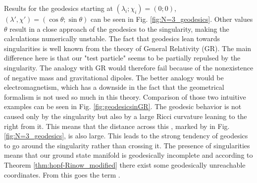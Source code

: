 Results for the geodesics starting at $(\lambda_i;\chi_i)=(0;0)$, $
(\lambda',\chi')=(\cos\theta;\sin\theta)$ can be seen in Fig. \ref{fig:N=3_geodesics}. Other values $\theta$ result in a close approach of the geodesics to the singularity, making the calculations numerically unstable. The fact that geodesics lean towards singularities is well known from the theory of General Relativity (GR). The main difference here is that our "test particle" seems to be partially repulsed by the singularity. The analogy with GR would therefore fail because of the nonexistence of negative mass and gravitational dipoles. The better analogy would be electromagnetism, which has a downside in the fact that the geometrical formalism is not used so much in this theory. Comparison of those two intuitive examples can be seen in Fig. \ref{fig:geodesicsinGR}. The geodesic behavior is not caused only by the singularity but also by a large Ricci curvature leaning to the right from it. This means that the distance across this \emph{}, marked by  in Fig. \ref{fig:N=3_geodesics}, is also large. This leads to the strong tendency of geodesics to go around the singularity rather than crossing it. The presence of singularities means that our ground state manifold is geodesically incomplete and according to Theorem \ref{thm:hopf-Rinow_modified} there exist some geodesically unreachable coordinates. From this goes the term \emph{}.



